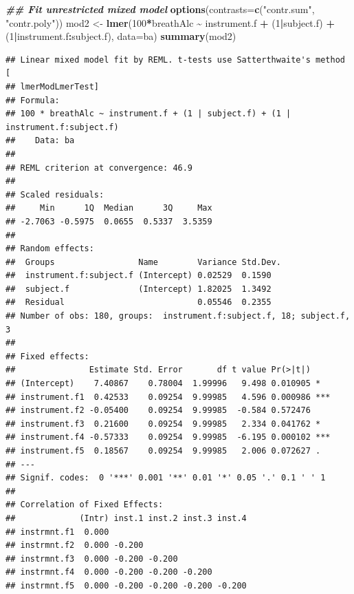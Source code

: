 \documentclass[
]{book}
\newenvironment{Shaded}{\begin{snugshade}}{\end{snugshade}}
\newcommand{\AttributeTok}[1]{\textcolor[rgb]{0.13,0.29,0.53}{#1}}
\newcommand{\DecValTok}[1]{\textcolor[rgb]{0.00,0.00,0.81}{#1}}
\newcommand{\DocumentationTok}[1]{\textcolor[rgb]{0.56,0.35,0.01}{\textbf{\textit{#1}}}}
\newcommand{\FunctionTok}[1]{\textcolor[rgb]{0.13,0.29,0.53}{\textbf{#1}}}
\newcommand{\NormalTok}[1]{#1}
\newcommand{\OtherTok}[1]{\textcolor[rgb]{0.56,0.35,0.01}{#1}}
\newcommand{\SpecialCharTok}[1]{\textcolor[rgb]{0.81,0.36,0.00}{\textbf{#1}}}
\newcommand{\StringTok}[1]{\textcolor[rgb]{0.31,0.60,0.02}{#1}}
\begin{document}
\begin{Shaded}
\begin{Highlighting}[]
\DocumentationTok{\#\# Fit unrestricted mixed model }
\FunctionTok{options}\NormalTok{(}\AttributeTok{contrasts=}\FunctionTok{c}\NormalTok{(}\StringTok{"contr.sum"}\NormalTok{, }\StringTok{"contr.poly"}\NormalTok{))}
\NormalTok{mod2 }\OtherTok{\textless{}{-}} \FunctionTok{lmer}\NormalTok{(}\DecValTok{100}\SpecialCharTok{*}\NormalTok{breathAlc }\SpecialCharTok{\textasciitilde{}}\NormalTok{ instrument.f }\SpecialCharTok{+}\NormalTok{ (}\DecValTok{1}\SpecialCharTok{|}\NormalTok{subject.f) }\SpecialCharTok{+}\NormalTok{ (}\DecValTok{1}\SpecialCharTok{|}\NormalTok{instrument.f}\SpecialCharTok{:}\NormalTok{subject.f), }\AttributeTok{data=}\NormalTok{ba)}
\FunctionTok{summary}\NormalTok{(mod2)}
\end{Highlighting}
\end{Shaded}

\begin{verbatim}
## Linear mixed model fit by REML. t-tests use Satterthwaite's method [
## lmerModLmerTest]
## Formula: 
## 100 * breathAlc ~ instrument.f + (1 | subject.f) + (1 | instrument.f:subject.f)
##    Data: ba
## 
## REML criterion at convergence: 46.9
## 
## Scaled residuals: 
##     Min      1Q  Median      3Q     Max 
## -2.7063 -0.5975  0.0655  0.5337  3.5359 
## 
## Random effects:
##  Groups                 Name        Variance Std.Dev.
##  instrument.f:subject.f (Intercept) 0.02529  0.1590  
##  subject.f              (Intercept) 1.82025  1.3492  
##  Residual                           0.05546  0.2355  
## Number of obs: 180, groups:  instrument.f:subject.f, 18; subject.f, 3
## 
## Fixed effects:
##               Estimate Std. Error       df t value Pr(>|t|)    
## (Intercept)    7.40867    0.78004  1.99996   9.498 0.010905 *  
## instrument.f1  0.42533    0.09254  9.99985   4.596 0.000986 ***
## instrument.f2 -0.05400    0.09254  9.99985  -0.584 0.572476    
## instrument.f3  0.21600    0.09254  9.99985   2.334 0.041762 *  
## instrument.f4 -0.57333    0.09254  9.99985  -6.195 0.000102 ***
## instrument.f5  0.18567    0.09254  9.99985   2.006 0.072627 .  
## ---
## Signif. codes:  0 '***' 0.001 '**' 0.01 '*' 0.05 '.' 0.1 ' ' 1
## 
## Correlation of Fixed Effects:
##             (Intr) inst.1 inst.2 inst.3 inst.4
## instrmnt.f1  0.000                            
## instrmnt.f2  0.000 -0.200                     
## instrmnt.f3  0.000 -0.200 -0.200              
## instrmnt.f4  0.000 -0.200 -0.200 -0.200       
## instrmnt.f5  0.000 -0.200 -0.200 -0.200 -0.200
\end{verbatim}
\end{document}
